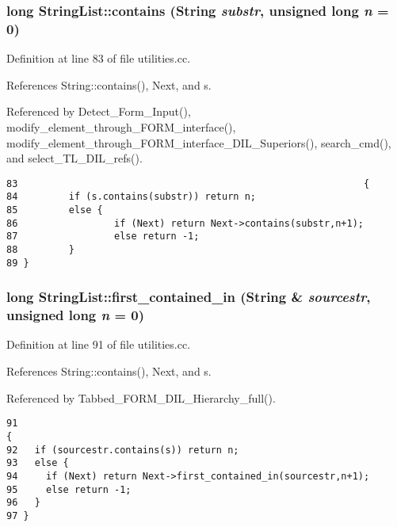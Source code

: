 \subsubsection{\setlength{\rightskip}{0pt plus 5cm}long String\-List::contains ({\bf String} {\em substr}, unsigned long {\em n} = 0)}\label{classStringList_a12}




Definition at line 83 of file utilities.cc.

References String::contains(), Next, and s.

Referenced by Detect\_\-Form\_\-Input(), modify\_\-element\_\-through\_\-FORM\_\-interface(), modify\_\-element\_\-through\_\-FORM\_\-interface\_\-DIL\_\-Superiors(), search\_\-cmd(), and select\_\-TL\_\-DIL\_\-refs().



\footnotesize\begin{verbatim}83                                                             {
84         if (s.contains(substr)) return n;
85         else {
86                 if (Next) return Next->contains(substr,n+1);
87                 else return -1;
88         }
89 }
\end{verbatim}\normalsize 
{}
\subsubsection{\setlength{\rightskip}{0pt plus 5cm}long String\-List::first\_\-contained\_\-in ({\bf String} \& {\em sourcestr}, unsigned long {\em n} = 0)}\label{classStringList_a13}




Definition at line 91 of file utilities.cc.

References String::contains(), Next, and s.

Referenced by Tabbed\_\-FORM\_\-DIL\_\-Hierarchy\_\-full().



\footnotesize\begin{verbatim}91                                                                            {
92   if (sourcestr.contains(s)) return n;
93   else {
94     if (Next) return Next->first_contained_in(sourcestr,n+1);
95     else return -1;
96   }
97 }
\end{verbatim}\normalsize 
{}
